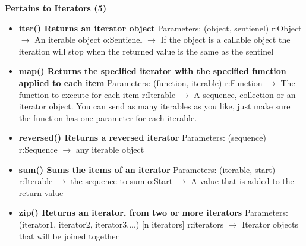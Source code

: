 \documentclass{report}
\begin{document}
      \begin{center}
        \textbf{Pertains to Iterators (5)}
      \end{center}
      \begin{itemize}
        \item[\ding{43}] \textbf{iter()	Returns an iterator object}
          \smallbreak \noindent
          Parameters: (object, sentienel)
          \smallbreak \noindent
          r:Object $\rightarrow$ An iterable object
          \smallbreak \noindent
          o:Sentienel $\rightarrow$ If the object is a callable object the iteration will stop when the returned value is the same as the sentinel
          \smallbreak \noindent
        \item[\ding{43}] \textbf{map()	Returns the specified iterator with the specified function applied to each item}
          \smallbreak \noindent
          Parameters: (function, iterable)
          \smallbreak \noindent
          r:Function $\rightarrow$ The function to execute for each item
          \smallbreak \noindent
          r:Iterable $\rightarrow$ A sequence, collection or an iterator object. You can send as many iterables as you like, just make sure the function has one parameter for each iterable.
          \smallbreak \noindent
        \item[\ding{43}] \textbf{reversed()	Returns a reversed iterator}
          \smallbreak \noindent
          Parameters: (sequence)
          \smallbreak \noindent
          r:Sequence $\rightarrow$ any iterable object
          \smallbreak \noindent
        \item[\ding{43}] \textbf{sum()	Sums the items of an iterator}
          \smallbreak \noindent
          Parameters: (iterable, start)
          \smallbreak \noindent
          r:Iterable $\rightarrow$ the sequence to sum
          \smallbreak \noindent
          o:Start $\rightarrow$ A value that is added to the return value
          \smallbreak \noindent
        \item[\ding{43}] \textbf{zip()	Returns an iterator, from two or more iterators}
          \smallbreak \noindent
          Parameters: (iterator1, iterator2, iterator3....) [n iterators]
          \smallbreak \noindent
          r:iterators $\rightarrow$ 	Iterator objects that will be joined together
          \smallbreak \noindent
      \end{itemize}
    

    \bigbreak \noindent 
    
\end{document}
